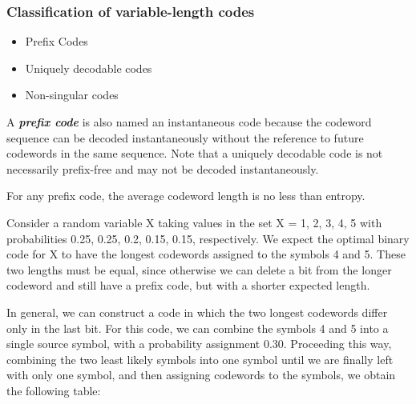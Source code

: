 \documentclass[a4]{beamer}
\begin{document}
\begin{frame}
\frametitle{Classification of variable-length codes}

\begin{itemize}
\item Prefix Codes
\item Uniquely decodable codes
\item Non-singular codes
\end{itemize}

A \textbf{\emph{prefix code}} is also named an instantaneous code because the codeword sequence can be decoded instantaneously without the reference to future codewords
in the same sequence. Note that a uniquely decodable code is not necessarily
prefix-free and may not be decoded instantaneously.

For any prefix code, the average codeword length is no less than entropy.
\end{frame}
\begin{frame}
Consider a random variable X taking values in the set
X = {1, 2, 3, 4, 5} with probabilities 0.25, 0.25, 0.2, 0.15, 0.15, respectively.
We expect the optimal binary code for X to have the longest
codewords assigned to the symbols 4 and 5. These two lengths must be
equal, since otherwise we can delete a bit from the longer codeword and
still have a prefix code, but with a shorter expected length.


\end{frame}
\begin{frame} In general,
we can construct a code in which the two longest codewords differ only
in the last bit. For this code, we can combine the symbols 4 and 5 into
a single source symbol, with a probability assignment 0.30. Proceeding
this way, combining the two least likely symbols into one symbol until
we are finally left with only one symbol, and then assigning codewords
to the symbols, we obtain the following table:


\end{frame}
\end{document}
